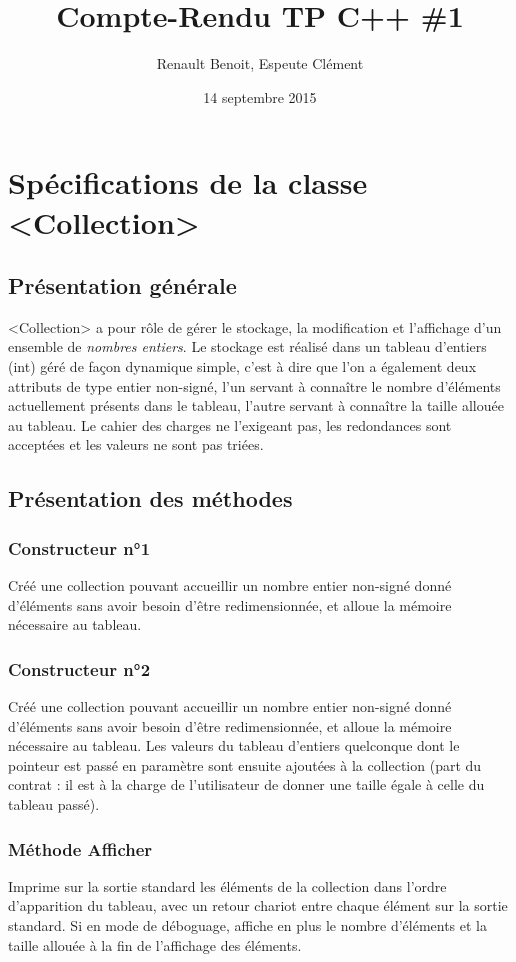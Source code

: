 \documentclass[11pt]{article}
\title{Compte-Rendu TP C++ \#1}
\author{{\sc Renault} Benoit, {\sc Espeute} Clément}
\date{14 septembre 2015}
\begin{document}
\pagestyle{fancy}
\maketitle

\section[Spécifications]{Spécifications de la classe <Collection>}

\subsection{Présentation générale}
<Collection> a pour rôle de gérer le stockage, la modification et l'affichage d'un ensemble de \emph{nombres entiers}. Le stockage est réalisé dans un tableau d'entiers (int) géré de façon dynamique simple, c'est à dire que l'on a également deux attributs de type entier non-signé, l'un servant à connaître le nombre d'éléments actuellement présents dans le tableau, l'autre servant à connaître la taille allouée au tableau. Le cahier des charges ne l'exigeant pas, les redondances sont acceptées et les valeurs ne sont pas triées.

\subsection{Présentation des méthodes}

\subsubsection*{Constructeur n°1}
Créé une collection pouvant accueillir un nombre entier non-signé donné d'éléments sans avoir besoin d'être redimensionnée, et alloue la mémoire nécessaire au tableau.

\subsubsection*{Constructeur n°2}
Créé une collection pouvant accueillir un nombre entier non-signé donné d'éléments sans avoir besoin d'être redimensionnée, et alloue la mémoire nécessaire au tableau. Les valeurs du tableau d'entiers quelconque dont le pointeur est passé en paramètre sont ensuite ajoutées à la collection (part du contrat : il est à la charge de l’utilisateur de donner une taille égale à celle du tableau passé).

\subsubsection*{Méthode Afficher}
Imprime sur la sortie standard les éléments de la collection dans l'ordre d’apparition du tableau, avec un retour chariot entre chaque élément sur la sortie standard. Si en mode de déboguage, affiche en plus le nombre d’éléments et la taille allouée à la fin de l’affichage des éléments.
\end{document}

